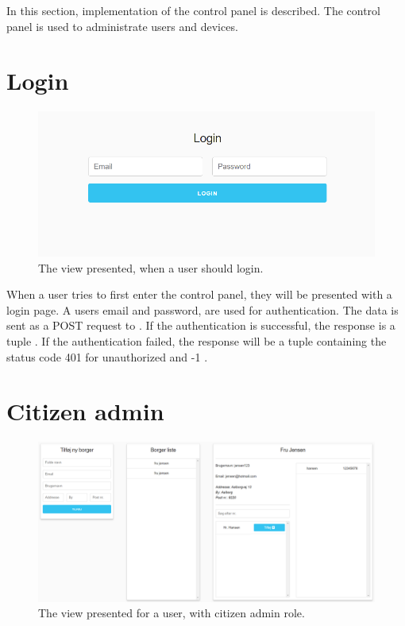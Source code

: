 In this section, implementation of the control panel is described. The control panel is used to administrate users and devices.

\section{Login}
\begin{figure}[H]
    \centering
    \includegraphics[scale=0.6]{Figures/ControlPanel/LoginView.png}
    \caption{The view presented, when a user should login.}
    \label{fig:controlPanelLoginView}
\end{figure}

When a user tries to first enter the control panel, they will be presented with a login page. A users email and password, are used for authentication. The data is sent as a POST request to . If the authentication is successful, the response is a tuple . If the authentication failed, the response will be a tuple containing the status code 401 for unauthorized and -1 .


\section{Citizen admin}
\begin{figure}[H]
    \centering
    \includegraphics[scale=0.4]{Figures/ControlPanel/CitizenAdminView.png}
    \caption{The view presented for a user, with citizen admin role.}
    \label{fig:controlPanelCitizenAdminView}
\end{figure}

